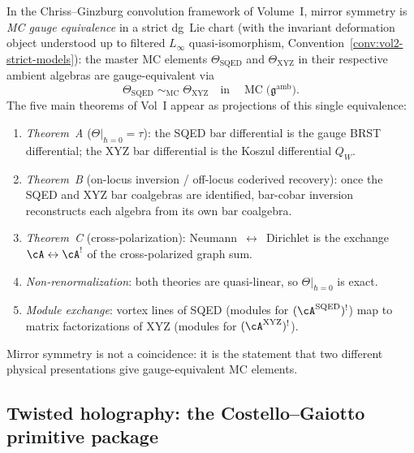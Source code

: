 \begin{remark}
\label{rem:mirror-bar-cobar-explicit}
In the Chriss--Ginzburg convolution framework of Volume~I,
mirror symmetry is \emph{MC gauge equivalence} in a strict dg~Lie
chart \textup{(}with the invariant deformation object understood up
to filtered $L_\infty$ quasi-isomorphism, Convention~\ref{conv:vol2-strict-models}\textup{)}:
the master MC
elements $\Theta_{\mathrm{SQED}}$ and $\Theta_{\mathrm{XYZ}}$
in their respective ambient algebras are gauge-equivalent via
\[
 \Theta_{\mathrm{SQED}}
 \;\sim_{\mathrm{MC}}\;
 \Theta_{\mathrm{XYZ}}
 \quad\text{in}\quad
 \operatorname{MC}\!\bigl(\mathfrak{g}^{\mathrm{amb}}\bigr).
\]
The five main theorems of Vol~I appear as projections of this
single equivalence:
\begin{enumerate}[label=\textup{(\roman*)},nosep]
\item \emph{Theorem~A} ($\Theta\big|_{\hbar=0} = \tau$): the
 SQED bar differential is the gauge BRST differential; the XYZ
 bar differential is the Koszul differential $Q_W$.
\item \emph{Theorem~B} (on-locus inversion / off-locus coderived
 recovery): once the SQED and XYZ bar coalgebras are identified,
 bar-cobar inversion reconstructs each algebra from its own bar
 coalgebra.
\item \emph{Theorem~C} (cross-polarization):
 Neumann~$\leftrightarrow$~Dirichlet is the exchange
 $\cA \leftrightarrow \cA^!$ of the cross-polarized graph sum.
\item \emph{Non-renormalization}: both theories are quasi-linear,
 so $\Theta\big|_{\hbar=0}$ is exact.
\item \emph{Module exchange}: vortex lines of SQED (modules for
 $(\cA^{\mathrm{SQED}})^!$) map to matrix factorizations of XYZ
 (modules for $(\cA^{\mathrm{XYZ}})^!$).
\end{enumerate}
Mirror symmetry is not a coincidence: it is the statement that two
different physical presentations give gauge-equivalent MC elements.
\end{remark}

%
%

\subsection{Twisted holography: the Costello--Gaiotto primitive package}
\label{subsec:twisted-holography-primitive}

